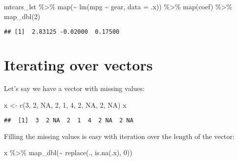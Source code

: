 \documentclass[
]{book}
\newenvironment{Shaded}{\begin{snugshade}}{\end{snugshade}}
\newcommand{\AttributeTok}[1]{\textcolor[rgb]{0.77,0.63,0.00}{#1}}
\newcommand{\ConstantTok}[1]{\textcolor[rgb]{0.00,0.00,0.00}{#1}}
\newcommand{\DecValTok}[1]{\textcolor[rgb]{0.00,0.00,0.81}{#1}}
\newcommand{\FunctionTok}[1]{\textcolor[rgb]{0.00,0.00,0.00}{#1}}
\newcommand{\NormalTok}[1]{#1}
\newcommand{\OtherTok}[1]{\textcolor[rgb]{0.56,0.35,0.01}{#1}}
\newcommand{\SpecialCharTok}[1]{\textcolor[rgb]{0.00,0.00,0.00}{#1}}
\begin{document}
\begin{Shaded}
\begin{Highlighting}[]
\NormalTok{mtcars\_lst }\SpecialCharTok{\%\textgreater{}\%}
  \FunctionTok{map}\NormalTok{(}\SpecialCharTok{\textasciitilde{}} \FunctionTok{lm}\NormalTok{(mpg }\SpecialCharTok{\textasciitilde{}}\NormalTok{ gear, }\AttributeTok{data =}\NormalTok{ .x)) }\SpecialCharTok{\%\textgreater{}\%}
  \FunctionTok{map}\NormalTok{(coef) }\SpecialCharTok{\%\textgreater{}\%}
  \FunctionTok{map\_dbl}\NormalTok{(}\DecValTok{2}\NormalTok{)}
\end{Highlighting}
\end{Shaded}

\begin{verbatim}
## [1]  2.83125 -0.02000  0.17500
\end{verbatim}

\hypertarget{iterating-over-vectors}{%
\section{Iterating over vectors}\label{iterating-over-vectors}}

Let's say we have a vector with missing values:

\begin{Shaded}
\begin{Highlighting}[]
\NormalTok{x }\OtherTok{\textless{}{-}} \FunctionTok{c}\NormalTok{(}\DecValTok{3}\NormalTok{, }\DecValTok{2}\NormalTok{, }\ConstantTok{NA}\NormalTok{, }\DecValTok{2}\NormalTok{, }\DecValTok{1}\NormalTok{, }\DecValTok{4}\NormalTok{, }\DecValTok{2}\NormalTok{, }\ConstantTok{NA}\NormalTok{, }\DecValTok{2}\NormalTok{, }\ConstantTok{NA}\NormalTok{)}
\NormalTok{x}
\end{Highlighting}
\end{Shaded}

\begin{verbatim}
##  [1]  3  2 NA  2  1  4  2 NA  2 NA
\end{verbatim}

Filling the missing values is easy with iteration over the length of the vector:

\begin{Shaded}
\begin{Highlighting}[]
\NormalTok{x }\SpecialCharTok{\%\textgreater{}\%} \FunctionTok{map\_dbl}\NormalTok{(}\SpecialCharTok{\textasciitilde{}} \FunctionTok{replace}\NormalTok{(., }\FunctionTok{is.na}\NormalTok{(.x), }\DecValTok{0}\NormalTok{))}
\end{Highlighting}
\end{Shaded}
\end{document}
